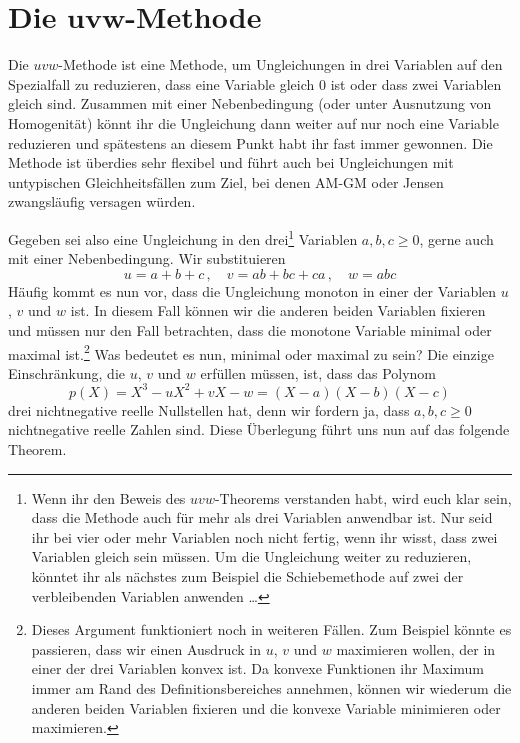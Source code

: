 \section{Die \texorpdfstring{$\boldsymbol{uvw}$}{uvw}-Methode}\label{kapitel:uvw}
Die $uvw$-Methode ist eine Methode, um Ungleichungen in drei Variablen auf den Spezialfall zu reduzieren, dass eine Variable gleich $0$ ist oder dass zwei Variablen gleich sind. Zusammen mit einer Nebenbedingung (oder unter Ausnutzung von Homogenität) könnt ihr die Ungleichung dann weiter auf nur noch eine Variable reduzieren und spätestens an diesem Punkt habt ihr fast immer gewonnen. Die Methode ist überdies sehr flexibel und führt auch bei Ungleichungen mit untypischen Gleichheitsfällen zum Ziel, bei denen AM-GM oder Jensen zwangsläufig versagen würden.

Gegeben sei also eine Ungleichung in den drei\footnote{Wenn ihr den Beweis des $uvw$-Theorems verstanden habt, wird euch klar sein, dass die Methode auch für mehr als drei Variablen anwendbar ist. Nur seid ihr bei vier oder mehr Variablen noch nicht fertig, wenn ihr wisst, dass zwei Variablen gleich sein müssen. Um die Ungleichung weiter zu reduzieren, könntet ihr als nächstes zum Beispiel die Schiebemethode auf zwei der verbleibenden Variablen anwenden \ldots} Variablen $a,b,c\geqslant 0$, gerne auch mit einer Nebenbedingung. Wir substituieren
\begin{equation*}
	u=a+b+c\,,\quad v=ab+bc+ca\,,\quad w=abc
\end{equation*}
Häufig kommt es nun vor, dass die Ungleichung monoton in einer der Variablen $u$, $v$ und $w$ ist. In diesem Fall können wir die anderen beiden Variablen fixieren und müssen nur den Fall betrachten, dass die monotone Variable minimal oder maximal ist.\footnote{Dieses Argument funktioniert noch in weiteren Fällen. Zum Beispiel könnte es passieren, dass wir einen Ausdruck in $u$, $v$ und $w$ maximieren wollen, der in einer der drei Variablen konvex ist. Da konvexe Funktionen ihr Maximum immer am Rand des Definitionsbereiches annehmen, können wir wiederum die anderen beiden Variablen fixieren und die konvexe Variable minimieren oder maximieren.} Was bedeutet es nun, minimal oder maximal zu sein? Die einzige Einschränkung, die $u$, $v$ und $w$ erfüllen müssen, ist, dass das Polynom
\begin{equation*}
	p(X)=X^3-uX^2+vX-w=(X-a)(X-b)(X-c)
\end{equation*}
drei nichtnegative reelle Nullstellen hat, denn wir fordern ja, dass $a,b,c\geqslant 0$ nichtnegative reelle Zahlen sind. Diese Überlegung führt uns nun auf das folgende Theorem.
